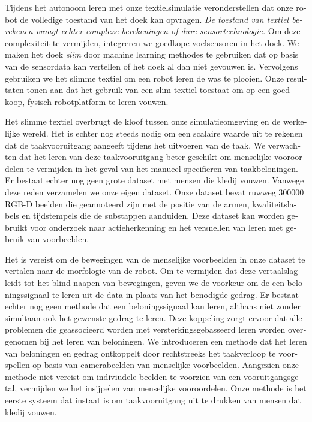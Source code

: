 \documentclass[\home/main.tex]{subfiles}
\begin{document}
\begin{otherlanguage}{dutch}
Tijdens het autonoom leren met onze textielsimulatie veronderstellen dat onze robot de volledige toestand van het doek kan opvragen. \emph{De toestand van textiel berekenen vraagt echter complexe berekeningen of dure sensortechnologie.} Om deze complexiteit te vermijden, integreren we goedkope voelsensoren in het doek. We maken het doek \textit{slim} door machine learning methodes te gebruiken dat op basis van de sensordata kan vertellen of het doek al dan niet gevouwen is. Vervolgens gebruiken we het slimme textiel om een robot leren de was te plooien. Onze resultaten tonen aan dat het gebruik van een slim textiel toestaat om op een goedkoop, fysisch robotplatform te leren vouwen.

Het slimme textiel overbrugt de kloof tussen onze simulatieomgeving en de werkelijke wereld. Het is echter nog steeds nodig om een scalaire waarde uit te rekenen dat de taakvooruitgang aangeeft tijdens het uitvoeren van de taak. We verwachten dat het leren van deze taakvooruitgang beter geschikt om menselijke vooroordelen te vermijden in het geval van het manueel specifieren van taakbeloningen. Er bestaat echter nog geen grote dataset met mensen die kledij vouwen. Vanwege deze reden verzamelen we onze eigen dataset. Onze dataset bevat ruwweg \qty{300000}{} RGB-D beelden die geannoteerd zijn met de positie van de armen, kwaliteitslabels en tijdstempels die de substappen aanduiden. Deze dataset kan worden gebruikt voor onderzoek naar actieherkenning en het versnellen van leren met gebruik van voorbeelden.

Het is vereist om de bewegingen van de menselijke voorbeelden in onze dataset te vertalen naar de morfologie van de robot. Om te vermijden dat deze vertaalslag leidt tot het blind naapen van bewegingen, geven we de voorkeur om de een beloningssignaal te leren uit de data in plaats van het benodigde gedrag. 
Er bestaat echter nog geen methode dat een beloningssignaal kan leren, althans niet zonder simultaan ook het gewenste gedrag te leren. Deze koppeling zorgt ervoor dat alle problemen die geassocieerd worden met versterkingsgebasseerd leren worden overgenomen bij het leren van beloningen. 
We introduceren een methode dat het leren van beloningen en gedrag ontkoppelt door rechtstreeks het taakverloop te voorspellen op basis van camerabeelden van menselijke voorbeelden. Aangezien onze methode niet vereist om indiviudele beelden te voorzien van een vooruitgangsgetal, vermijden we het insijpelen van menselijke vooroordelen. Onze methode is het eerste systeem dat instaat is om taakvooruitgang uit te drukken van mensen dat kledij vouwen. 


\end{otherlanguage}
\end{document}

